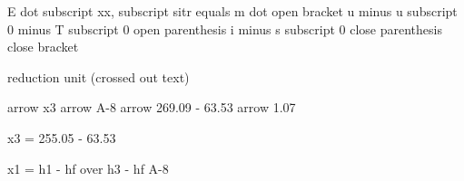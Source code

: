E dot subscript xx, subscript sitr equals m dot open bracket u minus u subscript 0 minus T subscript 0 open parenthesis i minus s subscript 0 close parenthesis close bracket

reduction unit (crossed out text)

arrow x3 arrow A-8 arrow 269.09 - 63.53 arrow 1.07

x3 = 255.05 - 63.53

x1 = h1 - hf over h3 - hf A-8